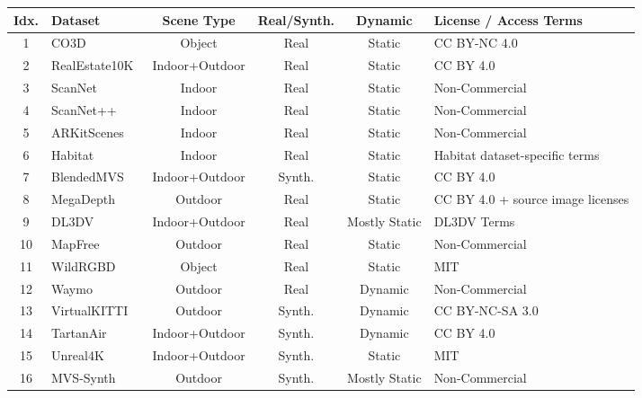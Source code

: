 \documentclass{llmxive}
\providecommand{\arraystretch}{1.15}
\begin{document}

\begin{table}[h]
\centering
\tiny
\setlength{\tabcolsep}{3.2pt}
\renewcommand{\arraystretch}{1.1}
\begin{tabularx}{\textwidth}{@{}c >{\centering\arraybackslash}X c c c >{\centering\arraybackslash}X@{}}
\toprule
\textbf{Idx.} & \textbf{Dataset} & \textbf{Scene Type} & \textbf{Real/Synth.} & \textbf{Dynamic} & \textbf{License / Access Terms} \\
\midrule
1  & CO3D~\cite{reizenstein2021co3d} & Object & Real & Static & CC BY-NC 4.0 \\
2  & RealEstate10K~\cite{zhou2018stereomagnification} & Indoor+Outdoor & Real & Static & CC BY 4.0 \\
3  & ScanNet~\cite{dai2017scannet} & Indoor & Real & Static & Non-Commercial \\
4  & ScanNet++~\cite{yeshwanth2023scannet++} & Indoor & Real & Static & Non-Commercial \\
5  & ARKitScenes~\cite{dehghan2021arkitscenes} & Indoor & Real & Static & Non-Commercial \\
6  & Habitat~\cite{savva2019habitat} & Indoor & Real & Static & Habitat dataset-specific terms \\
7  & BlendedMVS~\cite{yao2020blendedmvs} & Indoor+Outdoor & Synth. & Static & CC BY 4.0 \\
8  & MegaDepth~\cite{li2018megadepth} & Outdoor & Real & Static & CC BY 4.0 + source image licenses \\
9  & DL3DV~\cite{ling2024dl3dv} & Indoor+Outdoor & Real & Mostly Static & DL3DV Terms \\
10 & MapFree~\cite{arnold2022mapfree} & Outdoor & Real & Static & Non-Commercial \\
11 & WildRGBD~\cite{xia2024wildrgbd} & Object & Real & Static & MIT \\
12 & Waymo~\cite{sun2020waymo} & Outdoor & Real & Dynamic & Non-Commercial \\
13 & VirtualKITTI~\cite{cabon2020vkitti} & Outdoor & Synth. & Dynamic & CC BY-NC-SA 3.0 \\
14 & TartanAir~\cite{wang2020tartanair} & Indoor+Outdoor & Synth. & Dynamic & CC BY 4.0 \\
15 & Unreal4K~\cite{tosi2021unreal} & Indoor+Outdoor & Synth. & Static & MIT \\
16 & MVS-Synth~\cite{huang2018mvs} & Outdoor & Synth. & Mostly Static & Non-Commercial \\

\end{tabularx}
\end{table}
\end{document}
